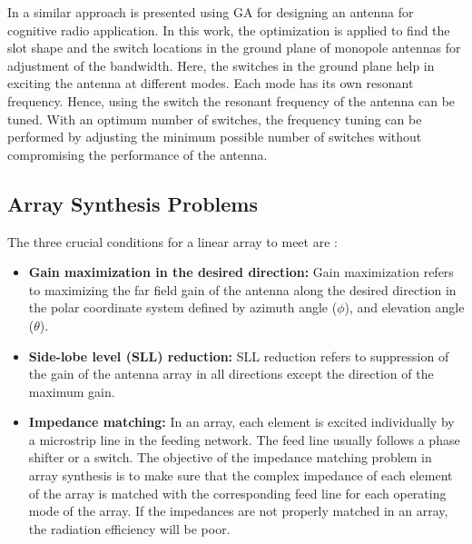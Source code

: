 In \cite{freqReconfCogn} a similar approach is presented using GA for designing an antenna for cognitive radio application. In this work, the optimization is applied to find the slot shape and the switch locations in the ground plane of monopole antennas for adjustment of the bandwidth. Here, the switches in the ground plane help in exciting the antenna at different modes. Each mode has its own resonant frequency. Hence, using the switch the resonant frequency of the antenna can be tuned. With an optimum number of switches, the frequency tuning can be performed by adjusting the minimum possible number of switches without compromising the performance of the antenna.

\subsection{Array Synthesis Problems}
The three crucial conditions for a linear array to meet are \cite{arraySynth1}:
\begin{itemize}
\item \textbf{Gain maximization in the desired direction:} Gain maximization refers to maximizing the far field gain of the antenna along the desired direction in the polar coordinate system defined by azimuth angle ($\phi$), and elevation angle ($\theta$).
\item \textbf{Side-lobe level (SLL) reduction:} SLL reduction refers to suppression of the gain of the antenna array in all directions except the direction of the maximum gain.
\item \textbf{Impedance matching:} In an array, each element is excited individually by a microstrip line in the feeding network. The feed line usually follows a phase shifter or a switch. The objective of the impedance matching problem in array synthesis is to make sure that the complex impedance of each element of the array is matched with the corresponding feed line for each operating mode of the array. If the impedances are not properly matched in an array, the radiation efficiency will be poor.
\end{itemize}

